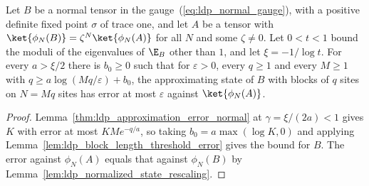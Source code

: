 \begin{lemma}
    \label{lem:ldp_approximation_error_slope_threshold}
    \leanok
    Let $B$ be a normal tensor in the gauge~(\ref{eq:ldp_normal_gauge}), with a
    positive definite fixed point $\sigma$ of trace one, and let $A$ be a tensor
    with $\ket{\phi_N(B)}=\zeta^N\ket{\phi_N(A)}$ for all $N$ and some
    $\zeta\neq0$. Let $0<t<1$ bound the moduli of the eigenvalues of $\E_B$ other
    than $1$, and let $\xi=-1/\log t$. For every $a>\xi/2$ there is $b_0\ge0$
    such that for $\varepsilon>0$, every $q\ge1$ and every $M\ge1$ with
    $q\ge a\log(Mq/\varepsilon)+b_0$, the approximating state of $B$ with
    blocks of $q$ sites on $N=Mq$ sites has error at most $\varepsilon$ against
    $\ket{\phi_N(A)}$.
\end{lemma}
\begin{proof}
    \leanok
    Lemma~\ref{thm:ldp_approximation_error_normal} at $\gamma=\xi/(2a)<1$
    gives $K$ with error at most $KMe^{-q/a}$, so taking $b_0=a\max(\log K,0)$ and
    applying Lemma~\ref{lem:ldp_block_length_threshold_error} gives the bound
    for $B$. The error against
    $\phi_N(A)$ equals that against $\phi_N(B)$ by
    Lemma~\ref{lem:ldp_normalized_state_rescaling}.
\end{proof}

